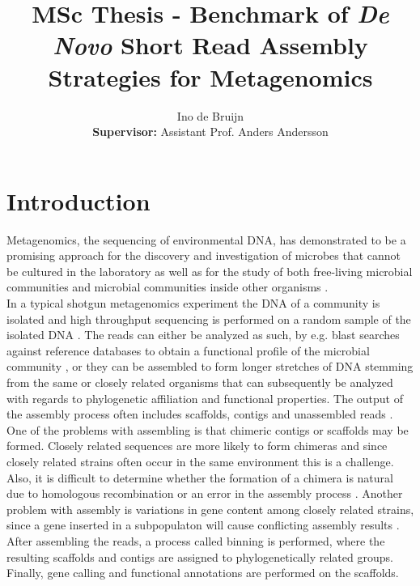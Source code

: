 \documentclass[a4paper,12pt]{report}
\begin{document}
\title{MSc Thesis - Benchmark of {\em De Novo} Short Read Assembly Strategies for Metagenomics}
\author{Ino de Bruijn\\ {\bf Supervisor:} Assistant Prof. Anders Andersson}

\maketitle

\tableofcontents

\chapter{Introduction}
Metagenomics, the sequencing of environmental DNA, has demonstrated to be a
promising approach for the discovery and investigation of microbes that cannot
be cultured in the laboratory \cite{Eisen17355177} as well as for the study of
both free-living microbial communities \cite{Andersson18497291} and microbial
communities inside other organisms \cite{Qin20203603,Hess21273488}.\\


In a typical shotgun metagenomics experiment the DNA of a community is isolated
and high throughput sequencing is performed on a random sample of the isolated
DNA \cite{Morgan20419134}. The reads can either be analyzed as such, by e.g.
blast searches against reference databases to obtain a functional profile of
the microbial community \cite{Tringe15845853}, or they can be assembled to form
longer stretches of DNA stemming from the same or closely related organisms
that can subsequently be analyzed with regards to phylogenetic affiliation and
functional properties. The output of the assembly process often includes
scaffolds, contigs and unassembled reads \cite{Mavromatis17468765}. One of the
problems with assembling is that chimeric contigs or scaffolds may be formed.
Closely related sequences are more likely to form chimeras and since closely
related strains often occur in the same environment this is a challenge. Also,
it is difficult to determine whether the formation of a chimera is natural due
to homologous recombination or an error in the assembly process
\cite{Tyson14961025}. Another problem with assembly is variations in gene
content among closely related strains, since a gene inserted in a subpopulaton
will cause conflicting assembly results \cite{Hallam17114289}. After assembling
the reads, a process called binning is performed, where the resulting scaffolds
and contigs are assigned to phylogenetically related groups. Finally, gene
calling and functional annotations are performed on the scaffolds.\\
\end{document}
